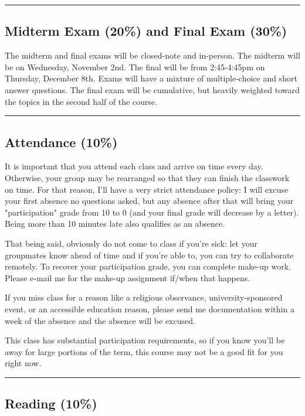 \documentclass[11pt]{article}
\begin{document}
\noindent\rule{\textwidth}{0.5pt}

\subsection*{Midterm Exam (20\%) and Final Exam (30\%)}
\label{sec:org6fdec88}

The midterm and final exams will be closed-note and in-person. The midterm will be on Wednesday, November 2nd. The final will be from 2:45-4:45pm on Thursday, December 8th. Exams will have a mixture of multiple-choice and short answer questions. The final exam will be cumulative, but heavily weighted toward the topics in the second half of the course.

\noindent\rule{\textwidth}{0.5pt}

\subsection*{Attendance (10\%)}
\label{sec:org60bed6b}

It is important that you attend each class and arrive on time every day. Otherwise, your group may be rearranged so that they can finish the classwork on time. For that reason, I'll have a very strict attendance policy: I will excuse your first absence no questions asked, but any absence after that will bring your "participation" grade from 10 to 0 (and your final grade will decrease by a letter). Being more than 10 minutes late also qualifies as an absence.

That being said, obviously do not come to class if you're sick: let your groupmates know ahead of time and if you're able to, you can try to collaborate remotely. To recover your participation grade, you can complete make-up work. Please e-mail me for the make-up assignment if/when that happens.

If you miss class for a reason like a religious observance, university-sponsored event, or an accessible education reason, please send me documentation within a week of the absence and the absence will be excused.

This class has substantial participation requirements, so if you know you'll be away for large portions of the term, this course may not be a good fit for you right now.

\noindent\rule{\textwidth}{0.5pt}

\subsection*{Reading (10\%)}
\label{sec:org7460d8f}
\end{document}
